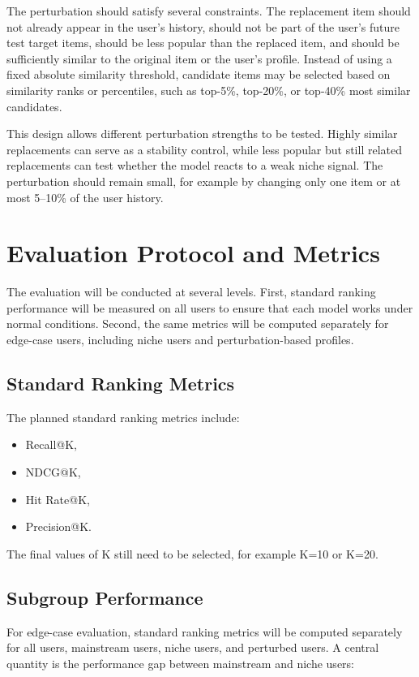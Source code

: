 \documentclass[sigconf]{acmart}
\begin{document}
The perturbation should satisfy several constraints. The replacement item should not already appear in the user's history, should not be part of the user's future test target items, should be less popular than the replaced item, and should be sufficiently similar to the original item or the user's profile. Instead of using a fixed absolute similarity threshold, candidate items may be selected based on similarity ranks or percentiles, such as top-5\%, top-20\%, or top-40\% most similar candidates.

This design allows different perturbation strengths to be tested. Highly similar replacements can serve as a stability control, while less popular but still related replacements can test whether the model reacts to a weak niche signal. The perturbation should remain small, for example by changing only one item or at most 5--10\% of the user history.

\section{Evaluation Protocol and Metrics}
The evaluation will be conducted at several levels. First, standard ranking performance will be measured on all users to ensure that each model works under normal conditions. Second, the same metrics will be computed separately for edge-case users, including niche users and perturbation-based profiles.

\subsection{Standard Ranking Metrics}
The planned standard ranking metrics include:

\begin{itemize}
  \item Recall@K,
  \item NDCG@K,
  \item Hit Rate@K,
  \item Precision@K.
\end{itemize}

The final values of K still need to be selected, for example K=10 or K=20.

\subsection{Subgroup Performance}
For edge-case evaluation, standard ranking metrics will be computed separately for all users, mainstream users, niche users, and perturbed users. A central quantity is the performance gap between mainstream and niche users:
\end{document}
